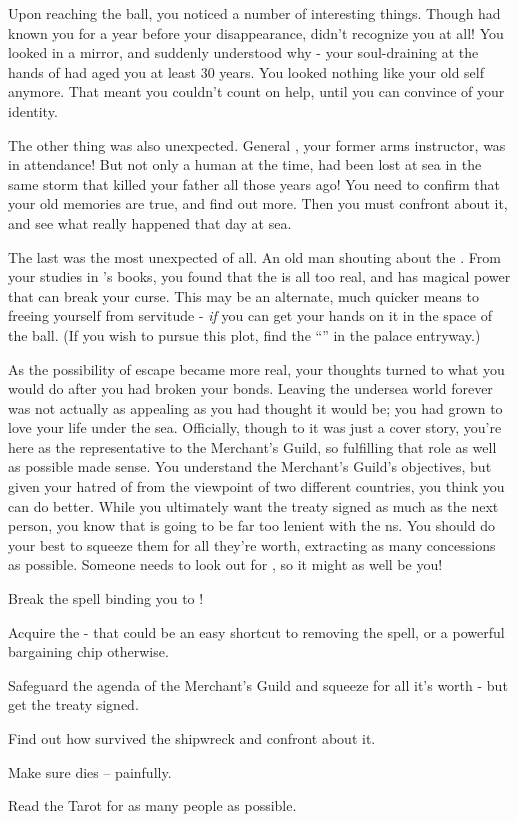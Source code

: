 \documentclass[char]{NeptuneBall}
\begin{document}
Upon reaching the ball, you noticed a number of interesting things. Though \cAriel{} had known you for a year before your disappearance, \cAriel{\they} didn't recognize you at all! You looked in a mirror, and suddenly understood why - your soul-draining at the hands of \cWitch{} had aged you at least 30 years. You looked nothing like your old self anymore. That meant you couldn't count on \cAriel{\their} help, until you can convince \cAriel{\them} of your identity.

The other thing was also unexpected. General \cGeneral{}, your former arms instructor, was in attendance! But not only \cGeneral{\were} \cGeneral{\they} a human at the time, \cGeneral{\they} had been lost at sea in the same storm that killed your father all those years ago! You need to confirm that your old memories are true, and find out more. Then you must confront \cGeneral{\them} about it, and see what really happened that day at sea.

The last was the most unexpected of all. An old man shouting about the \iWishingStone{\MYname}. From your studies in \cWitch{}'s books, you found that the \iWishingStone{\MYname} is all too real, and has magical power that can break your curse. This may be an alternate, much quicker means to freeing yourself from servitude - \emph{if} you can get your hands on it in the space of the ball. (If you wish to pursue this plot, find the ``\sOldMan{}'' in the palace entryway.)

As the possibility of escape became more real, your thoughts turned to what you would do after you had broken your bonds. Leaving the undersea world forever was not actually as appealing as you had thought it would be; you had grown to love your life under the sea. Officially, though to \cWitch{} it was just a cover story, you're here as the representative to the Merchant's Guild, so fulfilling that role as well as possible made sense. You understand the Merchant's Guild's objectives, but given your hatred of \pPacifica{} from the viewpoint of two different countries, you think you can do better. While you ultimately want the treaty signed as much as the next person, you know that \cKing{\King} \cKing{} is going to be far too lenient with the \pPacifica{}ns. You should do your best to squeeze them for all they're worth, extracting as many concessions as possible.  Someone needs to look out for \pAtlantis{}, so it might as well be you!

\begin{itemz}[Goals]
	\item Break the spell binding you to \cWitch{}!
	\item Acquire the \iWishingStone{} - that could be an easy shortcut to removing the spell, or a powerful bargaining chip otherwise.
  \item Safeguard the agenda of the Merchant's Guild and squeeze \pPacifica{} for all it's worth - but get the treaty signed.
	\item Find out how \cGeneral{} survived the shipwreck and confront \cGeneral{\them} about it.
	\item Make sure \cWitch{} dies -- painfully.
	\item Read the Tarot for as many people as possible.
\end{itemz}
\end{document}
